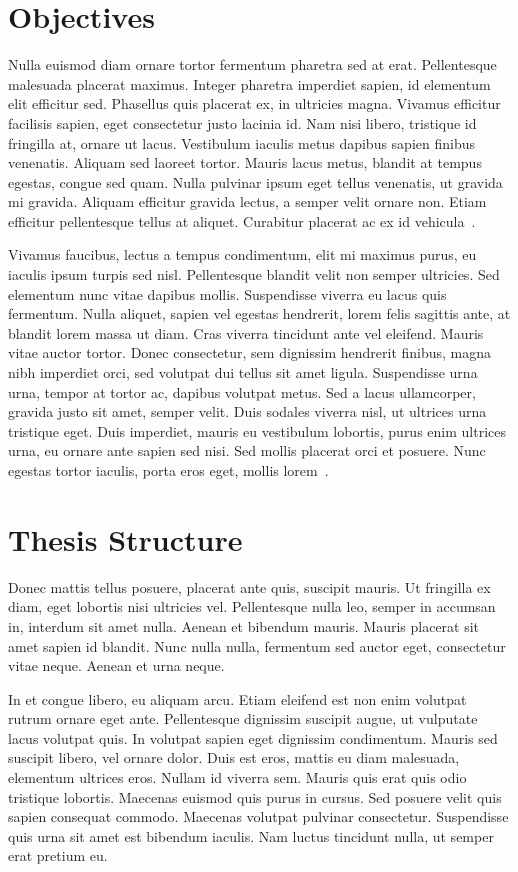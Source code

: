 \section{Objectives}

Nulla euismod diam ornare tortor fermentum pharetra sed at erat. Pellentesque malesuada placerat maximus. Integer pharetra imperdiet sapien, id elementum elit efficitur sed. Phasellus quis placerat ex, in ultricies magna. Vivamus efficitur facilisis sapien, eget consectetur justo lacinia id. Nam nisi libero, tristique id fringilla at, ornare ut lacus. Vestibulum iaculis metus dapibus sapien finibus venenatis. Aliquam sed laoreet tortor. Mauris lacus metus, blandit at tempus egestas, congue sed quam. Nulla pulvinar ipsum eget tellus venenatis, ut gravida mi gravida. Aliquam efficitur gravida lectus, a semper velit ornare non. Etiam efficitur pellentesque tellus at aliquet. Curabitur placerat ac ex id vehicula~\cite{Topic1_Author_Year}.

Vivamus faucibus, lectus a tempus condimentum, elit mi maximus purus, eu iaculis ipsum turpis sed nisl. Pellentesque blandit velit non semper ultricies. Sed elementum nunc vitae dapibus mollis. Suspendisse viverra eu lacus quis fermentum. Nulla aliquet, sapien vel egestas hendrerit, lorem felis sagittis ante, at blandit lorem massa ut diam. Cras viverra tincidunt ante vel eleifend. Mauris vitae auctor tortor. Donec consectetur, sem dignissim hendrerit finibus, magna nibh imperdiet orci, sed volutpat dui tellus sit amet ligula. Suspendisse urna urna, tempor at tortor ac, dapibus volutpat metus. Sed a lacus ullamcorper, gravida justo sit amet, semper velit. Duis sodales viverra nisl, ut ultrices urna tristique eget. Duis imperdiet, mauris eu vestibulum lobortis, purus enim ultrices urna, eu ornare ante sapien sed nisi. Sed mollis placerat orci et posuere. Nunc egestas tortor iaculis, porta eros eget, mollis lorem~\cite{Topic2_Author_Year}.

\section{Thesis Structure}

Donec mattis tellus posuere, placerat ante quis, suscipit mauris. Ut fringilla ex diam, eget lobortis nisi ultricies vel. Pellentesque nulla leo, semper in accumsan in, interdum sit amet nulla. Aenean et bibendum mauris. Mauris placerat sit amet sapien id blandit. Nunc nulla nulla, fermentum sed auctor eget, consectetur vitae neque. Aenean et urna neque.

In et congue libero, eu aliquam arcu. Etiam eleifend est non enim volutpat rutrum ornare eget ante. Pellentesque dignissim suscipit augue, ut vulputate lacus volutpat quis. In volutpat sapien eget dignissim condimentum. Mauris sed suscipit libero, vel ornare dolor. Duis est eros, mattis eu diam malesuada, elementum ultrices eros. Nullam id viverra sem. Mauris quis erat quis odio tristique lobortis. Maecenas euismod quis purus in cursus. Sed posuere velit quis sapien consequat commodo. Maecenas volutpat pulvinar consectetur. Suspendisse quis urna sit amet est bibendum iaculis. Nam luctus tincidunt nulla, ut semper erat pretium eu.